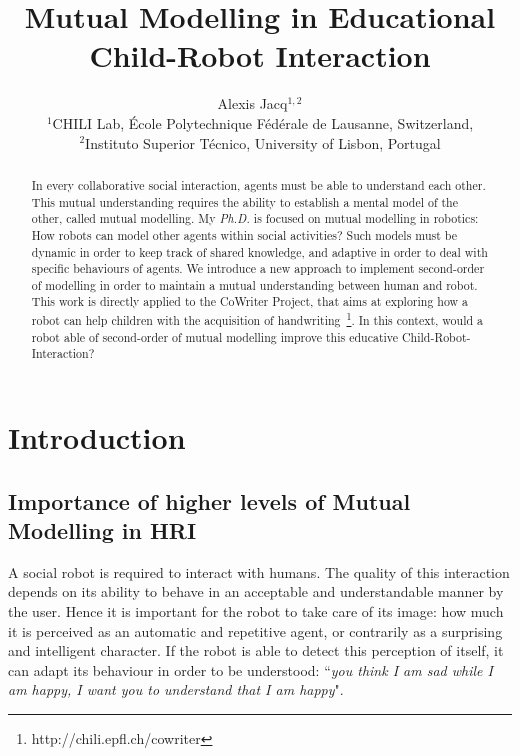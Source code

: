 \documentclass[10pt,a4paper]{article}
\begin{document}
\title{Mutual Modelling in Educational Child-Robot Interaction}


\author{Alexis Jacq$^{1,2}$\\
$^1$CHILI Lab, \'Ecole Polytechnique F\'ed\'erale de Lausanne, Switzerland,\\
$^2$Instituto Superior T\'{e}cnico, University of Lisbon, Portugal}



\maketitle
\begin{abstract}
In every collaborative social interaction, agents must be able to understand each other. This mutual understanding requires the ability to establish a mental model of the other, called mutual modelling. 
My \textit{Ph.D.} is focused on mutual modelling in robotics: How robots can model other agents within social activities? Such models must be dynamic in order to keep track of shared knowledge, and adaptive in order to deal with specific behaviours of agents. We introduce a new approach to implement second-order of modelling in order to maintain a mutual understanding between human and robot. 
This work is directly applied to the CoWriter Project, that aims at exploring how a robot can help children with the acquisition of handwriting~\footnote{http://chili.epfl.ch/cowriter}. 
In this context, would a robot able of second-order of mutual modelling improve this educative Child-Robot-Interaction?
\end{abstract}


\section{Introduction}
\subsection{Importance of higher levels of Mutual Modelling in HRI}
A social robot is required to interact with humans. 
The quality of this interaction depends on its ability to behave in an acceptable and understandable manner by the user. 
Hence it is important for the robot to take care of its image: how much it is perceived as an automatic and repetitive agent, or contrarily as a surprising and intelligent character. If the robot is able to detect this perception of itself, it can adapt its behaviour in order to be understood: ``\textit{you think I am sad while I am happy, I want you to understand that I am happy}". 
\end{document}
